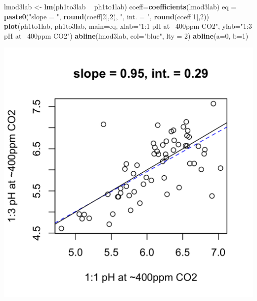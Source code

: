 \documentclass[]{article}
\newenvironment{Shaded}{\begin{snugshade}}{\end{snugshade}}
\newcommand{\DataTypeTok}[1]{\textcolor[rgb]{0.13,0.29,0.53}{#1}}
\newcommand{\DecValTok}[1]{\textcolor[rgb]{0.00,0.00,0.81}{#1}}
\newcommand{\KeywordTok}[1]{\textcolor[rgb]{0.13,0.29,0.53}{\textbf{#1}}}
\newcommand{\NormalTok}[1]{#1}
\newcommand{\OperatorTok}[1]{\textcolor[rgb]{0.81,0.36,0.00}{\textbf{#1}}}
\newcommand{\StringTok}[1]{\textcolor[rgb]{0.31,0.60,0.02}{#1}}
\begin{document}
\begin{Shaded}
\begin{Highlighting}[]
\NormalTok{lmod3lab <-}\StringTok{ }\KeywordTok{lm}\NormalTok{(ph1to3lab }\OperatorTok{~}\StringTok{ }\NormalTok{ph1to1lab)}
\NormalTok{coeff=}\KeywordTok{coefficients}\NormalTok{(lmod3lab)}
\NormalTok{eq =}\StringTok{ }\KeywordTok{paste0}\NormalTok{(}\StringTok{"slope = "}\NormalTok{, }\KeywordTok{round}\NormalTok{(coeff[}\DecValTok{2}\NormalTok{],}\DecValTok{2}\NormalTok{), }\StringTok{", int. = "}\NormalTok{, }\KeywordTok{round}\NormalTok{(coeff[}\DecValTok{1}\NormalTok{],}\DecValTok{2}\NormalTok{))}
\KeywordTok{plot}\NormalTok{(ph1to1lab, ph1to3lab, }\DataTypeTok{main=}\NormalTok{eq,}
   \DataTypeTok{xlab=}\StringTok{"1:1 pH at ~400ppm CO2"}\NormalTok{, }\DataTypeTok{ylab=}\StringTok{"1:3 pH at ~400ppm CO2"}\NormalTok{)}
\KeywordTok{abline}\NormalTok{(lmod3lab, }\DataTypeTok{col=}\StringTok{"blue"}\NormalTok{, }\DataTypeTok{lty =} \DecValTok{2}\NormalTok{)}
\KeywordTok{abline}\NormalTok{(}\DataTypeTok{a=}\DecValTok{0}\NormalTok{, }\DataTypeTok{b=}\DecValTok{1}\NormalTok{)}
\end{Highlighting}
\end{Shaded}

\includegraphics{output-rmd/whitman-figure-request-3-lab-spooner-1.png}
\end{document}
